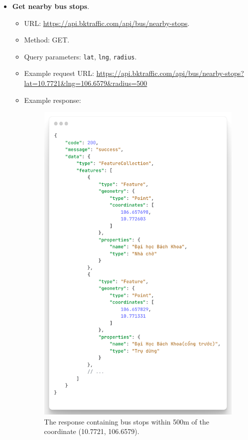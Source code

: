 \begin{itemize}
    \item \textbf{Get nearby bus stops}.
    \begin{itemize}
        \item URL: \url{https://api.bktraffic.com/api/bus/nearby-stops}.
        \item Method: GET.
        \item Query parameters: \lstinline{lat}, \lstinline{lng}, \lstinline{radius}.
        \item Example request URL: \url{https://api.bktraffic.com/api/bus/nearby-stops?lat=10.7721&lng=106.6579&radius=500}
        \item Example response: 
        \begin{figure}[H]
            \centering
            \includegraphics[width=0.45\linewidth]{assets/images/Implementation/nearby_bus_response.png}
            \caption{The response containing bus stops within 500m of the coordinate (10.7721, 106.6579).}
            \label{fig:nearby_stop_response}
        \end{figure}
    \end{itemize}


\end{itemize}
